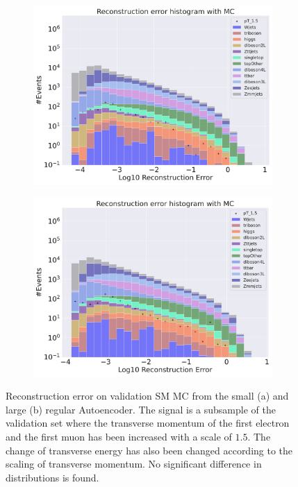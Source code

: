 \begin{figure}[H]
    \centering
    \begin{subfigure}{.45\textwidth}
        \includegraphics[width=\textwidth]{Figures/AE_testing/small/b_data_recon_big_rm3_feats_sig_pT_1.5.pdf}
        \caption{ }
        \label{fig:ae_small_pt_1_5}
    \end{subfigure}
    \hfill 
    \begin{subfigure}{.45\textwidth}
        \includegraphics[width=\textwidth]{Figures/AE_testing/big/b_data_recon_big_rm3_feats_sig_pT_1.5.pdf}
        \caption{ }
        \label{fig:ae_big_pt_1_5}
    \end{subfigure}
    \hfill 
    \caption[AE | Reconstruction error $p_T$ altering of 1.5]{Reconstruction error on validation SM MC from the small (a) and large (b) regular Autoencoder. The signal is a subsample of the validation 
    set where the transverse momentum of the first electron and the first muon has been increased with a scale of $1.5$. The change of transverse 
    energy has also been changed according to the scaling of transverse momentum. No significant difference in distributions is found. }
    \label{fig:ae_big_small_pt_1_5}
\end{figure}

